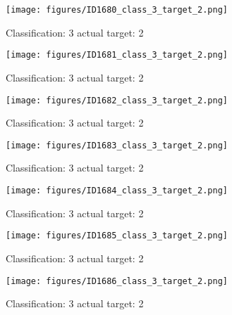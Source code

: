 \begin{figure}[h!]
\begin{center}
\texttt{[image: figures/ID1680\_class\_3\_target\_2.png]}
\end{center}
\caption{ Classification: 3 actual target: 2}
\label{fig:ID1680_class_3_target_2}
\end{figure}
\begin{figure}[h!]
\begin{center}
\texttt{[image: figures/ID1681\_class\_3\_target\_2.png]}
\end{center}
\caption{ Classification: 3 actual target: 2}
\label{fig:ID1681_class_3_target_2}
\end{figure}
\begin{figure}[h!]
\begin{center}
\texttt{[image: figures/ID1682\_class\_3\_target\_2.png]}
\end{center}
\caption{ Classification: 3 actual target: 2}
\label{fig:ID1682_class_3_target_2}
\end{figure}
\begin{figure}[h!]
\begin{center}
\texttt{[image: figures/ID1683\_class\_3\_target\_2.png]}
\end{center}
\caption{ Classification: 3 actual target: 2}
\label{fig:ID1683_class_3_target_2}
\end{figure}
\begin{figure}[h!]
\begin{center}
\texttt{[image: figures/ID1684\_class\_3\_target\_2.png]}
\end{center}
\caption{ Classification: 3 actual target: 2}
\label{fig:ID1684_class_3_target_2}
\end{figure}
\begin{figure}[h!]
\begin{center}
\texttt{[image: figures/ID1685\_class\_3\_target\_2.png]}
\end{center}
\caption{ Classification: 3 actual target: 2}
\label{fig:ID1685_class_3_target_2}
\end{figure}
\begin{figure}[h!]
\begin{center}
\texttt{[image: figures/ID1686\_class\_3\_target\_2.png]}
\end{center}
\caption{ Classification: 3 actual target: 2}
\label{fig:ID1686_class_3_target_2}
\end{figure}
